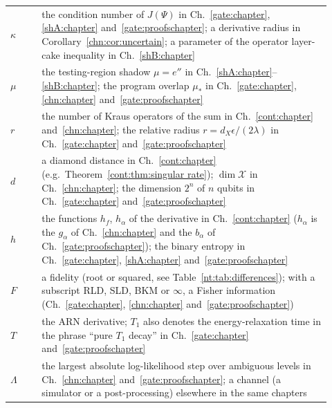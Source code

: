 {\begin{longtable}{>{\raggedright\arraybackslash}p{0.09\linewidth}>{\raggedright\arraybackslash}p{0.83\linewidth}}
$\kappa$ & the condition number of $J(\Psi)$ in Ch.~\ref{gate:chapter}, \ref{shA:chapter} and~\ref{gate:proofschapter}; a derivative radius in Corollary~\ref{chn:cor:uncertain}; a parameter of the operator layer-cake inequality in Ch.~\ref{shB:chapter}\\
$\mu$ & the testing-region shadow $\mu=e''$ in Ch.~\ref{shA:chapter}--\ref{shB:chapter}; the program overlap $\mu_*$ in Ch.~\ref{gate:chapter}, \ref{chn:chapter} and~\ref{gate:proofschapter}\\
$r$ & the number of Kraus operators of the sum in Ch.~\ref{cont:chapter} and~\ref{chn:chapter}; the relative radius $r=d_X\epsilon/(2\lambda)$ in Ch.~\ref{gate:chapter} and~\ref{gate:proofschapter}\\
$d$ & a diamond distance in Ch.~\ref{cont:chapter} (e.g.\ Theorem~\ref{cont:thm:singular rate}); $\dim\mathcal X$ in Ch.~\ref{chn:chapter}; the dimension $2^n$ of $n$ qubits in Ch.~\ref{gate:chapter} and~\ref{gate:proofschapter}\\
$h$ & the functions $h_f$, $h_\alpha$ of the derivative in Ch.~\ref{cont:chapter} ($h_\alpha$ is the $g_\alpha$ of Ch.~\ref{chn:chapter} and the $b_\alpha$ of Ch.~\ref{gate:proofschapter}); the binary entropy in Ch.~\ref{gate:chapter}, \ref{shA:chapter} and~\ref{gate:proofschapter}\\
$F$ & a fidelity (root or squared, see Table~\ref{nt:tab:differences}); with a subscript RLD, SLD, BKM or $\infty$, a Fisher information (Ch.~\ref{gate:chapter}, \ref{chn:chapter} and~\ref{gate:proofschapter})\\
$T$ & the ARN derivative; $T_1$ also denotes the energy-relaxation time in the phrase ``pure $T_1$ decay'' in Ch.~\ref{gate:chapter} and~\ref{gate:proofschapter}\\
$\Lambda$ & the largest absolute log-likelihood step over ambiguous levels in Ch.~\ref{chn:chapter} and~\ref{gate:proofschapter}; a channel (a simulator or a post-processing) elsewhere in the same chapters\\
\end{longtable}
}

\endgroup
